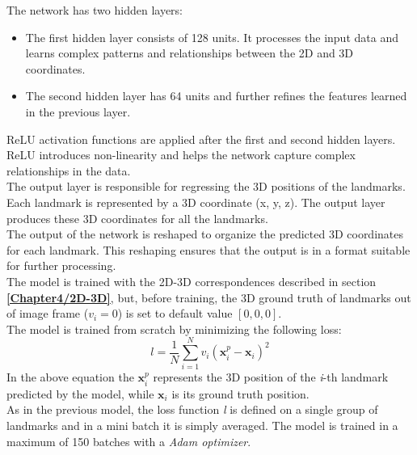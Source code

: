 The network has two hidden layers:
\begin{itemize}
    \item The first hidden layer consists of 128 units. It processes the input data and learns complex patterns and relationships between the 2D and 3D coordinates.
    \item The second hidden layer has 64 units and further refines the features learned in the previous layer.
\end{itemize}
ReLU activation functions are applied after the first and second hidden layers. ReLU introduces non-linearity and helps the network capture complex relationships in the data.\\
The output layer is responsible for regressing the 3D positions of the landmarks. Each landmark is represented by a 3D coordinate (x, y, z). The output layer produces these 3D coordinates for all the landmarks.\\
The output of the network is reshaped to organize the predicted 3D coordinates for each landmark. This reshaping ensures that the output is in a format suitable for further processing.\\
The model is trained with the 2D-3D correspondences described in section \textbf{\ref{Chapter4/2D-3D}}, but, before training, the 3D ground truth of landmarks out of image frame (\(v_i = 0\)) is set to default value \([0,0,0]\).\\
The model is trained from scratch by minimizing the following loss:
\begin{equation}
l = \frac{1}{N}\sum_{i=1}^N v_i(\textbf{x}_{i}^p - \textbf{x}_{i})^2
\end{equation}
In the above equation the \(\textbf{x}_{i}^p\) represents the 3D position of the \textit{i}-th landmark predicted by the model, while \(\textbf{x}_{i}\) is its ground truth position.\\
As in the previous model, the loss function \textit{l} is defined on a single group of landmarks and in a mini batch it is simply averaged. The model is trained in a maximum of 150 batches with a \textit{Adam optimizer}\cite{kingma2017adam}.

